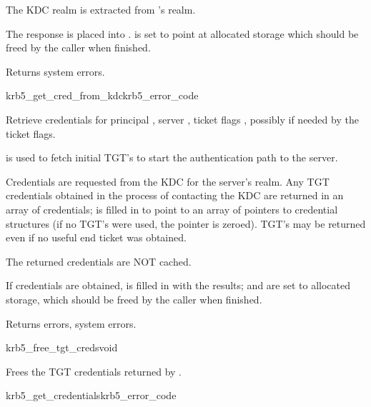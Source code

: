 The KDC realm is extracted from 's realm.

The response is placed into .
 is set to point at allocated storage
which should be freed by the caller when finished.

Returns system errors.

\begin{funcdecl}{krb5_get_cred_from_kdc}{krb5_error_code}{\funcin}
\funcinout
{}
\funcout			
{}
\end{funcdecl}

Retrieve credentials for principal ,
server ,
ticket flags , possibly
 if needed by the ticket flags.

 is used to fetch initial TGT's to start the authentication
path to the server.

Credentials are requested from the KDC for the server's realm.  Any
TGT credentials obtained in the process of contacting the KDC are
returned in an array of credentials;  is filled in to
point to an array of pointers to credential structures (if no TGT's were
used, the pointer is zeroed).  TGT's may be returned even if no useful
end ticket was obtained.

The returned credentials are NOT cached.

If credentials are obtained,  is filled in with the results;
 and
 are set to allocated storage,
which should be freed by the caller when finished.

Returns errors, system errors.


\begin{funcdecl}{krb5_free_tgt_creds}{void}{\funcin}
\end{funcdecl}

Frees the TGT credentials  returned by
.

\begin{funcdecl}{krb5_get_credentials}{krb5_error_code}{\funcin}
\funcinout
{}
\end{funcdecl}

